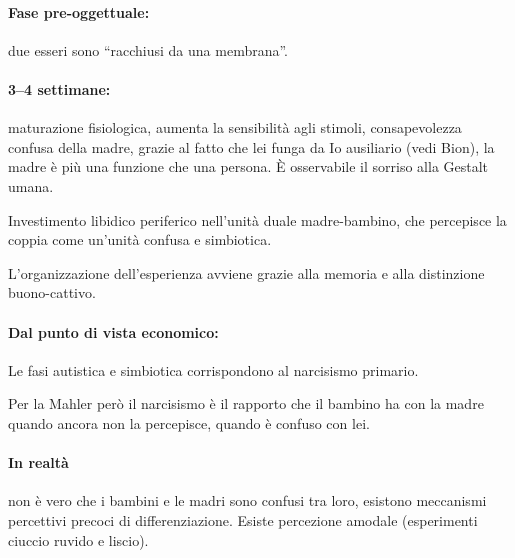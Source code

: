 \documentclass[12pt, a4paper]{article}
\begin{document}
\paragraph{Fase pre-oggettuale:} due esseri sono ``racchiusi da una membrana''.

\paragraph{3--4 settimane:} maturazione fisiologica, aumenta la sensibilit\`a agli stimoli, consapevolezza confusa della madre, grazie al fatto che lei funga da Io ausiliario (vedi Bion), la madre \`e pi\`u una funzione che una persona. \`E osservabile il sorriso alla Gestalt umana.

Investimento libidico periferico nell'unit\`a duale madre-bambino, che percepisce la coppia come un'unit\`a confusa e simbiotica.

L'organizzazione dell'esperienza avviene grazie alla memoria e alla distinzione buono-cattivo.

\paragraph{Dal punto di vista economico:} Le fasi autistica e simbiotica corrispondono al narcisismo primario.

Per la Mahler però il narcisismo \`e il rapporto che il bambino ha con la madre quando ancora non la percepisce, quando \`e confuso con lei.

\paragraph{In realt\`a} non \`e vero che i bambini e le madri sono confusi tra loro, esistono meccanismi percettivi precoci di differenziazione.  Esiste percezione amodale (esperimenti ciuccio ruvido e liscio).
\end{document}
